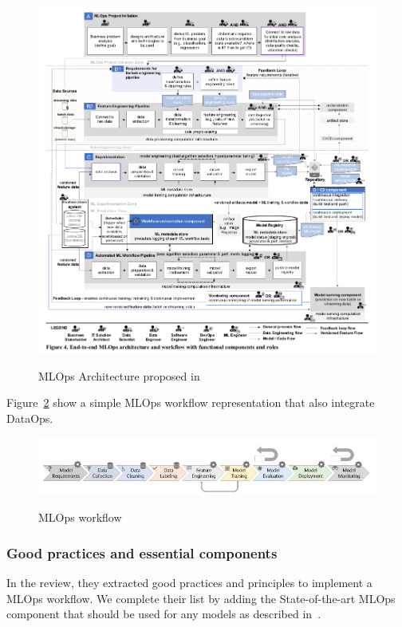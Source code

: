 \begin{figure}[!htbp]
    \caption{MLOps Architecture proposed in \cite{Kreuzberger2022MachineLO}}
    \centering
    \includegraphics[scale=0.5]{images/kreuz-end-to-end-workflow}
    \label{fig:end-to-end-workflow}
\end{figure}

Figure~\ref{fig:mlops-workflow} show a simple MLOps workflow representation that also integrate DataOps.
\begin{figure}[!htbp]
    \caption{MLOps workflow\cite{8804457}}
    \centering
    \includegraphics[scale=0.6]{images/mlops-workflow-9-stages}
    \label{fig:mlops-workflow}
\end{figure}

\subsubsection{Good practices and essential components}

In the review\cite{Kreuzberger2022MachineLO}, they extracted good practices and principles to implement a MLOps workflow.
We complete their list by adding the State-of-the-art MLOps component that should be used for any models as described in~\cite{BURGUENOROMERO2025107499}.

